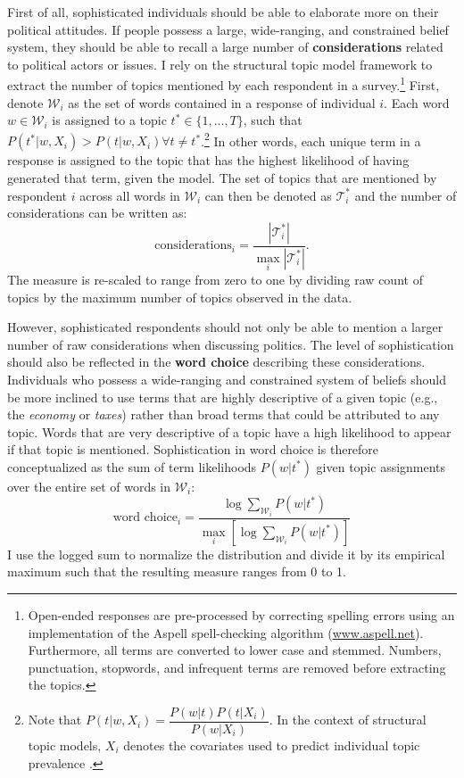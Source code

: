 \documentclass[12pt]{article}
\begin{document}
First of all, sophisticated individuals should be able to elaborate more on their political attitudes. If people possess a large, wide-ranging, and constrained belief system, they should be able to recall a large number of \textbf{considerations} related to political actors or issues. I rely on the structural topic model framework \citep{roberts2014structural} to extract the number of topics mentioned by each respondent in a survey.\footnote{Open-ended responses are pre-processed by correcting spelling errors using an implementation of the Aspell spell-checking algorithm (\url{www.aspell.net}). Furthermore, all terms are converted to lower case and stemmed. Numbers, punctuation, stopwords, and infrequent terms are removed before extracting the topics.} First, denote $\mathcal{W}_i$ as the set of words contained in a response of individual $i$. Each word $w\in\mathcal{W}_i$ is assigned to a topic $t^* \in \{1,...,T\} $, such that $P(t^*|w,X_i) > P(t|w,X_i) \forall t\neq t^*$.\footnote{Note that $P(t|w,X_i)=\dfrac{P(w|t)P(t|X_i)}{P(w|X_i)}$. In the context of structural topic models, $X_i$ denotes the covariates used to predict individual topic prevalence \citep[see][for details]{roberts2014structural}.} In other words, each unique term in a response is assigned to the topic that has the highest likelihood of having generated that term, given the model. The set of topics that are mentioned by respondent $i$ across all words in $\mathcal{W}_i$ can then be denoted as $\mathcal{T}^*_i$ and the number of considerations can be written as:
\begin{equation}
\text{considerations}_i = \dfrac{|\mathcal{T}^*_i|}{\max_i|\mathcal{T}^*_i|}.
\end{equation}
The measure is re-scaled to range from zero to one by dividing raw count of topics by the maximum number of topics observed in the data.

However, sophisticated respondents should not only be able to mention a larger number of raw considerations when discussing politics. The level of sophistication should also be reflected in the \textbf{word choice} describing these considerations. Individuals who possess a wide-ranging and constrained system of beliefs should be more inclined to use terms that are highly descriptive of a given topic (e.g., the \textit{economy} or \textit{taxes}) rather than broad terms that could be attributed to any topic. Words that are very descriptive of a topic have a high likelihood to appear if that topic is mentioned. Sophistication in word choice is therefore conceptualized as the sum of term likelihoods $P(w|t^*)$ given topic assignments over the entire set of words in $\mathcal{W}_i$:
\begin{equation}
\text{word choice}_i = \dfrac{\log\sum_{\mathcal{W}_i} P(w|t^*)}{\max_i\left[\log\sum_{\mathcal{W}_i} P(w|t^*)\right]}
\end{equation}
I use the logged sum to normalize the distribution and divide it by its empirical maximum such that the resulting measure ranges from 0 to 1.
\end{document}

